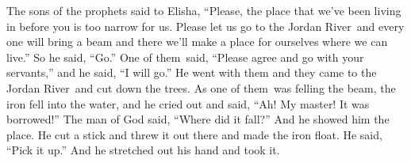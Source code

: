 
\begin{inparaenum}
     The sons of the prophets said to Elisha, ``Please, the place that we've been living in before you is too narrow for us.%
     Please let us go to the Jordan River\understood\ and every one will bring a beam and there we'll make a place for ourselves where we can live.'' So he said, ``Go.''%
     One of them\understood\ said, ``Please agree and go with your servants,'' and he said, ``I will go.''%
     He went with them and they came to the Jordan River\understood\ and cut down the trees.%
     As one of them\understood\ was felling the beam, the iron fell into the water, and he cried out and said, ``Ah! My master! It was borrowed!''%
     The man of God said, ``Where did it fall?'' And he showed him the place. He cut a stick and threw it out there and made the iron float.%
     He said, ``Pick it up.'' And he stretched out his hand and took it.%
    

\end{inparaenum}
